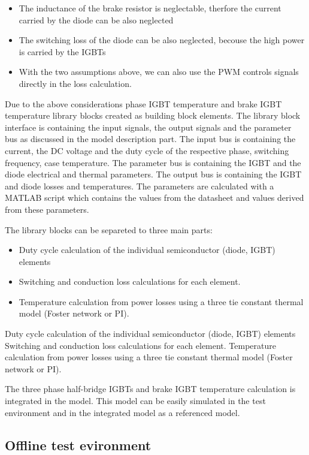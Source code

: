 \begin{itemize}
    \item The inductance of the brake resistor is neglectable, therfore the current carried by the diode can be also neglected
    \item The switching loss of the diode can be also neglected, becouse the high power is carried by the IGBTs
    \item With the two assumptions above, we can also use the PWM controls signals directly in the loss calculation.
\end{itemize}

Due to the above considerations phase IGBT temperature and brake IGBT temperature library blocks created as building block elements. The library block interface is containing the input signals, the output signals and the parameter bus as discussed in the model description part.
The input bus is containing the current, the DC voltage and the duty cycle of the respective phase, switching frequency, case temperature. The parameter bus is containing the IGBT and the diode electrical and thermal parameters. The output bus is containing the IGBT and diode losses and temperatures. The parameters are calculated with a MATLAB script which contains the values from the datasheet and values derived from these parameters.

The library blocks can be separeted to three main parts:
\begin{itemize}
    \item Duty cycle calculation of the individual semiconductor (diode, IGBT) elements
    \item Switching and conduction loss calculations for each element.
    \item Temperature calculation from power losses using a three tie constant thermal model (Foster network or PI). 
\end{itemize}
Duty cycle calculation of the individual semiconductor (diode, IGBT) elements
Switching and conduction loss calculations for each element.
Temperature calculation from power losses using a three tie constant thermal model (Foster network or PI). 

The three phase half-bridge IGBTs and brake IGBT temperature calculation is integrated in the model. This model can be easily simulated in the test environment and in the integrated model as a referenced model.

\subsection{Offline test evironment}

